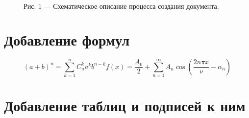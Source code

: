 \documentclass{article} %
\begin{document}
\begin{figure}[!h]
    \caption{Рис. 1 — Схематическое описание процесса создания документа.} %
	\label {fig_1} %
\end{figure}


\section{Добавление формул}

\begin{equation}\label{eq_1} %
    (a+b)^n=\sum_{k=1}^n C^k_n a^kb^{n-k}
	f(x) = \frac{A_0}{2} + \sum \limits_{n=1}^{\infty} A_n \cos \left( \frac{2 n \pi x}{\nu} - \alpha_n \right) 
\end{equation}

\section{Добавление таблиц и подписей к ним}
\end{document}
